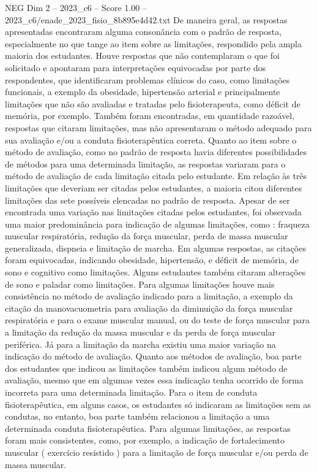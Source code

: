 \begin{textsample}{NEG Dim 2 – 2023\_c6 – Score 1.00 – 2023\_c6/enade\_2023\_fisio\_8b895e4d42.txt}
De maneira geral, as respostas apresentadas encontraram alguma consonância com o padrão de resposta, especialmente no que tange ao item sobre as limitações, respondido pela ampla maioria dos estudantes.
Houve respostas que não contemplaram o que foi solicitado e apontaram para interpretações equivocadas por parte dos respondentes, que identificaram problemas clínicos do caso, como limitações funcionais, a exemplo da obesidade, hipertensão arterial e principalmente limitações que não são avaliadas e tratadas pelo fisioterapeuta, como déficit de memória, por exemplo.
Também foram encontradas, em quantidade razoável, respostas que citaram limitações, mas não apresentaram o método adequado para sua avaliação e/ou a conduta fisioterapêutica correta.
Quanto ao item sobre o método de avaliação, como no padrão de resposta havia diferentes possibilidades de métodos para uma determinada limitação, as respostas variaram para o método de avaliação de cada limitação citada pelo estudante.
Em relação às três limitações que deveriam ser citadas pelos estudantes, a maioria citou diferentes limitações das sete possíveis elencadas no padrão de resposta.
Apesar de ser encontrada uma variação nas limitações citadas pelos estudantes, foi observada uma maior predominância para indicação de algumas limitações, como : fraqueza muscular respiratória, redução da força muscular, perda de massa muscular generalizada, dispneia e limitação de marcha.
Em algumas respostas, as citações foram equivocadas, indicando obesidade, hipertensão, e déficit de memória, de sono e cognitivo como limitações.
Alguns estudantes também citaram alterações de sono e paladar como limitações.
Para algumas limitações houve mais consistência no método de avaliação indicado para a limitação, a exemplo da citação da manovacuometria para avaliação da diminuição da força muscular respiratória e para o exame muscular manual, ou do teste de força muscular para a limitação da redução da massa muscular e da perda de força muscular periférica.
Já para a limitação da marcha existiu uma maior variação na indicação do método de avaliação.
Quanto aos métodos de avaliação, boa parte dos estudantes que indicou as limitações também indicou algum método de avaliação, mesmo que em algumas vezes essa indicação tenha ocorrido de forma incorreta para uma determinada limitação.
Para o item de conduta fisioterapêutica, em alguns casos, os estudantes só indicaram as limitações sem as condutas, no entanto, boa parte também relacionou a limitação a uma determinada conduta fisioterapêutica.
Para algumas limitações, as respostas foram mais consistentes, como, por exemplo, a indicação de fortalecimento muscular ( exercício resistido ) para a limitação de força muscular e/ou perda de massa muscular.

\end{textsample}
